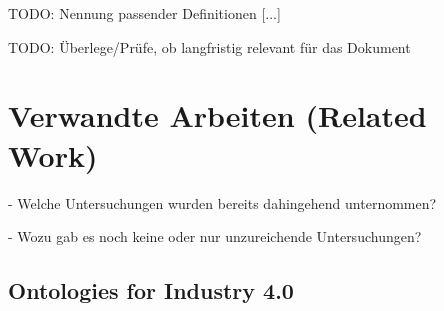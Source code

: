 \documentclass{article}
\begin{document}
TODO: Nennung passender Definitionen [...]

TODO: Überlege/Prüfe, ob langfristig relevant für das Dokument

\section{Verwandte Arbeiten (Related Work)}

- Welche Untersuchungen wurden bereits dahingehend unternommen?

- Wozu gab es noch keine oder nur unzureichende Untersuchungen?

\subsection{Ontologies for Industry 4.0}
%
\end{document}
